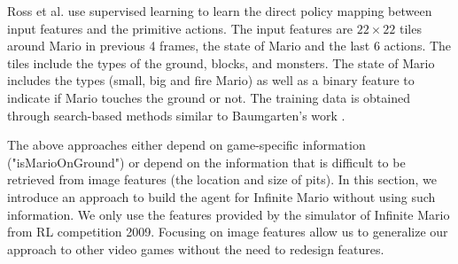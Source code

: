 Ross et al. \cite{Ross11} use supervised learning to learn the direct policy
mapping between input features and the primitive actions. The input features
are $22 \times 22$ tiles around Mario in previous 4 frames, the state of Mario
and the last 6 actions. The tiles include the types of the ground, blocks, and
monsters.  The state of Mario includes the types (small, big and fire Mario) as well as a
binary feature to indicate if Mario touches the ground or not.
The training data is obtained through search-based methods similar to Baumgarten's work \cite{Robin09}.


The above approaches either depend on game-specific information ("isMarioOnGround")
or depend on the information that is difficult to be retrieved from image features (the location and size of pits).
In this section, we introduce an approach 
to build the agent for Infinite Mario 
without using such information.
We only use the features provided by the simulator of Infinite Mario from RL competition 2009.
Focusing on image features allow us to generalize our approach to other video games without
the need to redesign features.




